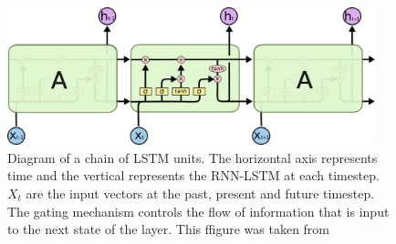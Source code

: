 \begin{figure}[h]
    \centering
    \includegraphics[height=4cm]{figures/lstm-chain}
    \caption{Diagram of a chain of LSTM units. The horizontal axis represents time and the vertical represents the RNN-LSTM at each timestep. $X_t$ are the input vectors at the past, present and future timestep. The gating mechanism controls the flow of information that is input to the next state of the layer. This ffigure was taken from \cite{lstm}}
    \label{fig:lstm}
\end{figure}


